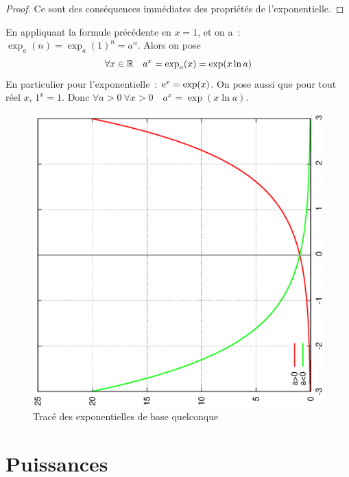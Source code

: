 \begin{proof} 
  Ce sont des conséquences immédiates des propriétés de l'exponentielle.
\end{proof}
%
En appliquant la formule précédente en $x=1$, et on a~: $\exp_a(n)=\exp_a(1)^n=a^n$. Alors on pose 
\begin{equation}
  \forall x \in \mathbb{R} \quad a^x=\exp_a(x)=\exp(x \ln a)
\end{equation}
En particulier pour l'exponentielle~: $\operatorname{e}^x=\exp(x)$. On pose aussi que pour tout réel $x$, $1^x=1$. Donc $\forall a>0 \ \forall x>0 \quad a^x=\exp(x \ln a)$.
%
\begin{figure}
  \centering
  \includegraphics[scale=0.4,angle=-90]{expa.ps}
  \caption{Tracé des exponentielles de base quelconque}
  \label{fig:traceexpa}
\end{figure}
%
\section{Puissances}
\label{sec:chap1-puissances}
